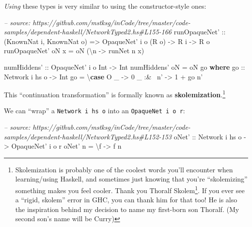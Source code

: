\documentclass[]{article}
\newenvironment{Shaded}{}{}
\newcommand{\KeywordTok}[1]{\textcolor[rgb]{0.00,0.44,0.13}{\textbf{{#1}}}}
\newcommand{\DataTypeTok}[1]{\textcolor[rgb]{0.56,0.13,0.00}{{#1}}}
\newcommand{\DecValTok}[1]{\textcolor[rgb]{0.25,0.63,0.44}{{#1}}}
\newcommand{\CommentTok}[1]{\textcolor[rgb]{0.38,0.63,0.69}{\textit{{#1}}}}
\newcommand{\OtherTok}[1]{\textcolor[rgb]{0.00,0.44,0.13}{{#1}}}
\newcommand{\FunctionTok}[1]{\textcolor[rgb]{0.02,0.16,0.49}{{#1}}}
\newcommand{\NormalTok}[1]{{#1}}
\renewcommand{\href}[2]{#2\footnote{\url{#1}}}
\begin{document}
\emph{Using} these types is very similar to using the constructor-style ones:

\begin{Shaded}
\begin{Highlighting}[]
\CommentTok{-- source: https://github.com/mstksg/inCode/tree/master/code-samples/dependent-haskell/NetworkTyped2.hs#L155-166}
\OtherTok{runOpaqueNet' ::} \NormalTok{(}\DataTypeTok{KnownNat} \NormalTok{i, }\DataTypeTok{KnownNat} \NormalTok{o)}
              \OtherTok{=>} \DataTypeTok{OpaqueNet'} \NormalTok{i o (}\DataTypeTok{R} \NormalTok{o)}
              \OtherTok{->} \DataTypeTok{R} \NormalTok{i}
              \OtherTok{->} \DataTypeTok{R} \NormalTok{o}
\NormalTok{runOpaqueNet' oN x }\FunctionTok{=} \NormalTok{oN (\textbackslash{}n }\OtherTok{->} \NormalTok{runNet n x)}

\OtherTok{numHiddens' ::} \DataTypeTok{OpaqueNet'} \NormalTok{i o }\DataTypeTok{Int} \OtherTok{->} \DataTypeTok{Int}
\NormalTok{numHiddens' oN }\FunctionTok{=} \NormalTok{oN go}
  \KeywordTok{where}
\OtherTok{    go ::} \DataTypeTok{Network} \NormalTok{i hs o }\OtherTok{->} \DataTypeTok{Int}
    \NormalTok{go }\FunctionTok{=} \NormalTok{\textbackslash{}}\KeywordTok{case} \DataTypeTok{O} \NormalTok{_      }\OtherTok{->} \DecValTok{0}
               \NormalTok{_ }\FunctionTok{:&~} \NormalTok{n' }\OtherTok{->} \DecValTok{1} \FunctionTok{+} \NormalTok{go n'}
\end{Highlighting}
\end{Shaded}

This ``continuation transformation'' is formally known as
\textbf{skolemization}.\footnote{Skolemization is probably one of the coolest
  words you'll encounter when learning/using Haskell, and sometimes just knowing
  that you're ``skolemizing'' something makes you feel cooler. Thank you
  \href{https://en.wikipedia.org/wiki/Thoralf_Skolem}{Thoralf Skolem}. If you
  ever see a ``rigid, skolem'' error in GHC, you can thank him for that too! He
  is also the inspiration behind my decision to name my first-born son Thoralf.
  (My second son's name will be Curry)}

We can ``wrap'' a \texttt{Network\ i\ hs\ o} into an
\texttt{OpaqueNet\textquotesingle{}\ i\ o\ r}:

\begin{Shaded}
\begin{Highlighting}[]
\CommentTok{-- source: https://github.com/mstksg/inCode/tree/master/code-samples/dependent-haskell/NetworkTyped2.hs#L152-153}
\OtherTok{oNet' ::} \DataTypeTok{Network} \NormalTok{i hs o }\OtherTok{->} \DataTypeTok{OpaqueNet'} \NormalTok{i o r}
\NormalTok{oNet' n }\FunctionTok{=} \NormalTok{\textbackslash{}f }\OtherTok{->} \NormalTok{f n}
\end{Highlighting}
\end{Shaded}
\end{document}
